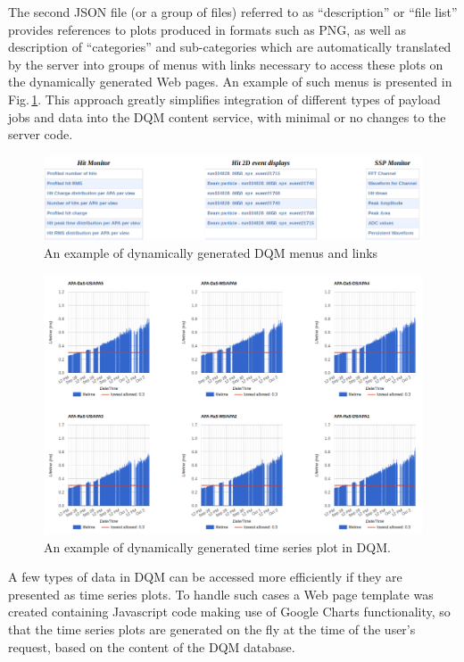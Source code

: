 \documentclass{webofc}
\begin{document}
The second JSON file (or a group of files) referred to as ``description'' or ``file list'' provides
references to plots produced in formats such as PNG, as well as description of ``categories''
and sub-categories which are automatically translated by the server into
groups of menus with links necessary to access these plots on the dynamically generated
Web pages. An example of such menus is presented in Fig.\,\ref{fig:tpc_monitor}.
This approach greatly simplifies integration of different types of payload jobs 
and data into the DQM content service, with minimal or no changes to the
server code.

\begin{figure}[tb]
\centering\includegraphics[width=1.0\textwidth]{figures/tpc_monitor_2018_v2.png}
\caption{\label{fig:tpc_monitor}An example of dynamically generated DQM menus and links}
\end{figure}


\begin{figure}[tb]
\centering\includegraphics[width=1.0\textwidth]{figures/purity_chart_2018_v2.png}
\caption{\label{fig:purity_chart}An example of dynamically generated time series plot in DQM.}
\end{figure}

A few types of data in DQM can be accessed more efficiently if they are presented as time
series plots. To handle such cases a Web page template was created containing
Javascript code making use of Google Charts functionality, so that the time series
plots are generated on the fly at the time of the user's request, based on the content
of the DQM database.
\end{document}
